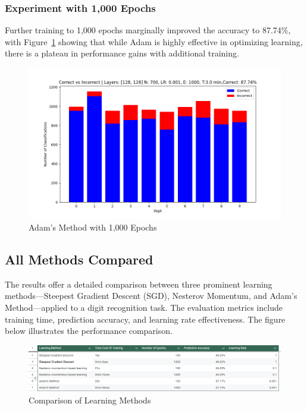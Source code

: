 \documentclass{article}
\begin{document}
\subsubsection{Experiment with 1,000 Epochs}
Further training to 1,000 epochs marginally improved the accuracy to 87.74\%, with Figure~\ref{fig:Adam_1000ep} showing that while Adam is highly effective in optimizing learning, there is a plateau in performance gains with additional training.

\begin{figure}[h!]
    \centering
    \includegraphics[scale=0.5]{../figs/Adam_1000ep.png}
    \caption{Adam's Method with 1,000 Epochs}
    \label{fig:Adam_1000ep}
\end{figure}

\newpage

\subsection{All Methods Compared}
The results offer a detailed comparison between three prominent learning methods—Steepest Gradient Descent (SGD), Nesterov Momentum, and Adam's Method—applied to a digit recognition task. The evaluation metrics include training time, prediction accuracy, and learning rate effectiveness. The figure below illustrates the performance comparison.

\begin{figure}[h!]
    \centering
    \includegraphics[scale=0.5]{../figs/LearningMethodsCompared.png}
    \caption{Comparison of Learning Methods}
    \label{fig:Comparison}
\end{figure}
\end{document}
